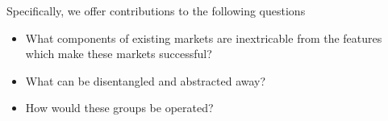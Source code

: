 Specifically, we offer contributions to the following questions
\begin{itemize}\itemsep0pt \parskip0pt
  \item What components of existing markets are inextricable from the features which make these markets successful?
  \item What can be disentangled and abstracted away?
  \item How would these groups be operated?
\end{itemize}